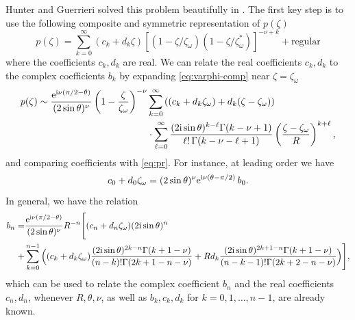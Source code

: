 \documentclass[a4paper,11pt]{article}
\theoremstyle{definition}
\newcommand{\re}{{\rm e}}
\newcommand{\ri}{{\rm i}}
\newcommand{\nn}{\nonumber \\}
\begin{document}
Hunter and Guerrieri solved this problem beautifully in
\cite{HunterGuerrieri1980}.  The first key step is to use the
following composite and symmetric representation of $p(\zeta)$
\begin{equation}
  p(\zeta) = \sum_{k=0}^\infty (c_k + d_k \zeta)
  \left[(1-\zeta/\zeta_\omega)(1-\zeta/\zeta_\omega^*)\right]^{-\nu+k} + \text{regular}
  \label{eq:varphi-comp}
\end{equation}
where the coefficients $c_k,d_k$ are real.  We can relate the real
coefficients $c_k,d_k$ to the complex coefficients $b_k$ by
expanding \eqref{eq:varphi-comp} near $\zeta = \zeta_\omega$
%
\begin{align}
  p(\zeta) \sim \frac{\re^{\ri\nu(\pi/2-\theta)}}{(2\sin\theta)^\nu}
  \left(1-\frac{\zeta}{\zeta_\omega}\right)^{-\nu}
  &\sum_{k=0}^\infty
    \left((c_k+d_k \zeta_\omega)+d_k(\zeta-\zeta_\omega)\right)\nn
  &\cdot\sum_{\ell=0}^\infty
    \frac{(2\ri\sin\theta)^{k-\ell}\Gamma(k-\nu+1)}
    {\ell!\, \Gamma(k-\nu-\ell+1)}
    \left(\frac{\zeta-\zeta_\omega}{R}\right)^{k+\ell},
\end{align}
%
and comparing coefficients with \eqref{eq:pr}.
For instance, at leading order we have
%
\begin{equation}
  c_0 + d_0 \zeta_\omega = (2\sin\theta)^\nu \re^{\ri\nu(\theta-\pi/2)} \, b_0.
\end{equation}
%
In general, we have the relation
\begin{align}
  b_n =
  &\frac{\re^{\ri\nu(\pi/2-\theta)}}{(2\sin\theta)^\nu} R^{-n}  
    \Bigg[(c_n+d_n\zeta_\omega)(2\ri\sin\theta)^n \nn+
  &\sum_{k=0}^{n-1}
    \Big((c_k+d_k \zeta_\omega)
    \frac{(2\ri\sin\theta)^{2k-n}\Gamma(k+1-\nu)}
    {(n-k)!\Gamma(2k+1-n-\nu)}
    +R d_k
    \frac{(2\ri\sin\theta)^{2k+1-n}\Gamma(k+1-\nu)}
    {(n-k-1)!\Gamma(2k+2-n-\nu)}\Big)\Bigg],
    \label{eq:bn}
\end{align}
which can be used to relate the complex coefficient $b_n$ and
the real coefficients $c_n,d_n$, whenever $R,\theta,\nu$, as well as
$b_k,c_k,d_k$ for $k=0,1,\ldots,n-1$, are already known.
\end{document}
